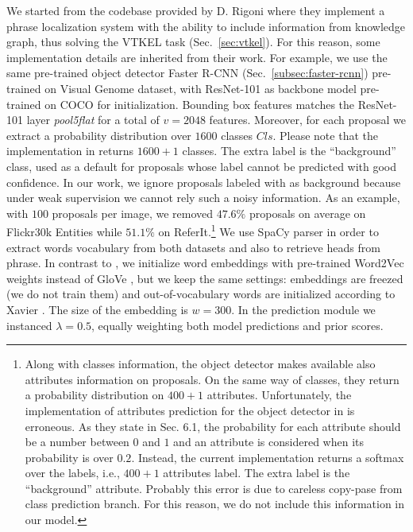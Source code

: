 We started from the codebase provided by D. Rigoni \etal{}
\cite{rigoni2021better} where they implement a phrase localization
system with the ability to include information from knowledge graph,
thus solving the VTKEL task (Sec.~\ref{sec:vtkel}). For this reason,
some implementation details are inherited from their work. For
example, we use the same pre-trained object detector Faster R-CNN
(Sec.~\ref{subsec:faster-rcnn}) pre-trained on Visual Genome
\cite{krishna2017visual} dataset, with ResNet-101 as backbone model
pre-trained on COCO for initialization. Bounding box features matches
the ResNet-101 layer \textit{pool5\textunderscore flat} for a total of
$v = 2048$ features. Moreover, for each proposal we extract a
probability distribution over $1600$ classes $Cls$. Please note that
the implementation in \cite{anderson2018bottom} returns $1600 + 1$
classes. The extra label is the ``background'' class, used as a
default for proposals whose label cannot be predicted with good
confidence. In our work, we ignore proposals labeled with as
background because under weak supervision we cannot rely such a noisy
information. As an example, with $100$ proposals per image, we removed
$47.6\%$ proposals on average on Flickr30k Entities while $51.1\%$ on
ReferIt.\footnote{Along with classes information, the object detector
makes available also attributes information on proposals. On the same
way of classes, they return a probability distribution on $400 + 1$
attributes. Unfortunately, the implementation of attributes prediction
for the object detector in \cite{anderson2018bottom} is erroneous. As
they state in Sec. 6.1, the probability for each attribute should be a
number between $0$ and $1$ and an attribute is considered when its
probability is over $0.2$. Instead, the current implementation returns
a softmax over the labels, i.e., $400 + 1$ attributes label. The extra
label is the ``background'' attribute. Probably this error is due to
careless copy-pase from class prediction branch. For this reason, we
do not include this information in our model.} We use SpaCy
\cite{honnibal2020spacy} parser in order to extract words vocabulary
from both datasets and also to retrieve heads from phrase. In contrast
to \cite{rigoni2021better}, we initialize word embeddings with
pre-trained Word2Vec \cite{mikolov2013efficient} weights instead of
GloVe \cite{pennington2014glove}, but we keep the same settings:
embeddings are freezed (we do not train them) and out-of-vocabulary
words are initialized according to Xavier
\cite{glorot2010understanding}. The size of the embedding is $w =
300$. In the prediction module we instanced $\lambda = 0.5$, equally
weighting both model predictions and prior scores.

